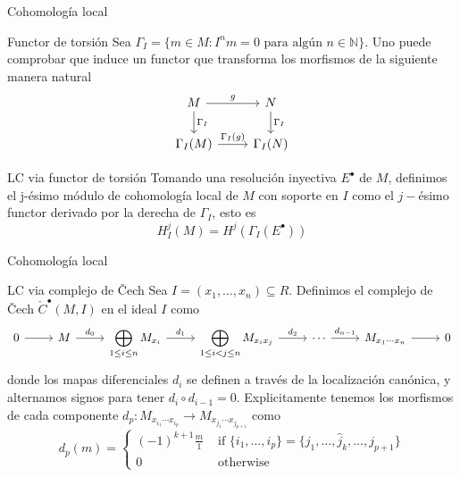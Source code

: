 \documentclass{beamer}
\begin{document}
\begin{frame}[fragile]{Cohomología local}
  \begin{block}{Functor de torsión}
Sea $\Gamma_I= \{m\in M : I^nm = 0 \text{ para algún }n\in \mathbb{N} \}$. Uno puede comprobar que induce un functor que transforma los morfismos de la siguiente manera natural
\[\begin{tikzcd}
	M & N \\
	{\Gamma_I(M)} & {\Gamma_I(N)}
	\arrow["{\Gamma_I}", from=1-1, to=2-1]
	\arrow["{\Gamma_I}", from=1-2, to=2-2]
	\arrow["g", from=1-1, to=1-2]
	\arrow["{\Gamma_I(g)}", from=2-1, to=2-2]
\end{tikzcd}\]
  \end{block}
  \begin{block}{LC via functor de torsión}
Tomando una resolución inyectiva $E^\bullet$ de $M$, definimos el j-ésimo módulo de cohomología local de $M$ con soporte en  $I$ como el  $j-$ésimo functor derivado por la derecha de $\Gamma_I $, esto es
\[
H_I^j(M)=H^j(\Gamma _I (E^\bullet) )
\] 
\end{block}
\end{frame}


\begin{frame}[fragile]{Cohomología local}
  \begin{block}{LC via complejo de \v{C}ech}
Sea $I=(x_1, \ldots, x_n)\subseteq R$. Definimos el complejo de \v{C}ech $\check{C}^{\bullet}(M, I)$ en el ideal $I$ como
\[\begin{tikzcd}
	0 & M & {\displaystyle{\bigoplus_{1\le i\le n} M_{x_i}}} & {\displaystyle{\bigoplus_{1\le i<j\le n} M_{x_ix_j}}} & \cdots & {M_{x_1\cdots x_n}} & 0
	\arrow[from=1-1, to=1-2]
	\arrow["{d_0}", from=1-2, to=1-3]
	\arrow["{d_1}", from=1-3, to=1-4]
	\arrow["{d_2}", from=1-4, to=1-5]
	\arrow["{d_{n-1}}", from=1-5, to=1-6]
	\arrow[from=1-6, to=1-7]
\end{tikzcd}\]
donde los mapas diferenciales $d_i$ se definen a través de la localización canónica, y alternamos signos para tener  $d_i\circ d_{i-1}=0$. Explicitamente tenemos los morfismos de cada componente
$d_p: M_{x_{i_1}\cdots x_{i_p}} \to M_{x_{j_1}\cdots x_{j_{p+1}}}$ como 
\[
  d_p(m) = \begin{cases}
	(-1)^{k+1} \frac{m}{1} &\text{ if } \{i_1, \ldots, i_p\} = \{j_1, \ldots, \hat{j}_k,\ldots, j_{p+1}\}\\ 0 &\text{ otherwise}
  \end{cases}
\] 
\end{block}
\end{frame}
\end{document}
